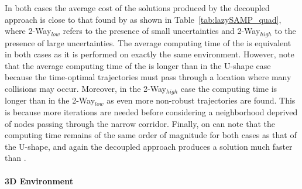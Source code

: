 In both cases the average cost of the solutions produced by the decoupled approach is close to that found by  as shown in Table~\ref{tab:lazySAMP_quad}, where 2-Way$_{low}$ refers to the presence of small uncertainties and 2-Way$_{high}$ to the presence of large uncertainties.
The average computing time of the  is equivalent in both cases as it is performed on exactly the same environment.
However, note that the average computing time of the  is longer than in the U-shape case because the time-optimal trajectories must pass through a location where many collisions may occur. 
Moreover, in the 2-Way$_{high}$ case the  computing time is longer than in the 2-Way$_{low}$ as even more non-robust trajectories are found.
This is because more iterations are needed before considering a neighborhood deprived of nodes passing through the narrow corridor.
Finally, on can note that the  computing time remains of the same order of magnitude for both cases as that of the U-shape, and again the decoupled approach produces a solution much faster than .

\paragraph{3D Environment} 

